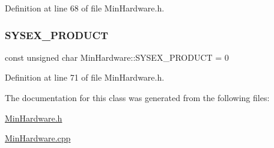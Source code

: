 Definition at line 68 of file Min\+Hardware.\+h.

\mbox{\label{class_min_hardware_a066765ceef59905283cebee0df489426}} 
\subsubsection{\texorpdfstring{S\+Y\+S\+E\+X\+\_\+\+P\+R\+O\+D\+U\+CT}{SYSEX\_PRODUCT}}
{\footnotesize\ttfamily const unsigned char Min\+Hardware\+::\+S\+Y\+S\+E\+X\+\_\+\+P\+R\+O\+D\+U\+CT = 0\hspace{0.3cm}{\ttfamily [static]}}



Definition at line 71 of file Min\+Hardware.\+h.



The documentation for this class was generated from the following files\+:\begin{DoxyCompactItemize}
\item 
\hyperlink{_min_hardware_8h}{Min\+Hardware.\+h}\item 
\hyperlink{_min_hardware_8cpp}{Min\+Hardware.\+cpp}\end{DoxyCompactItemize}
